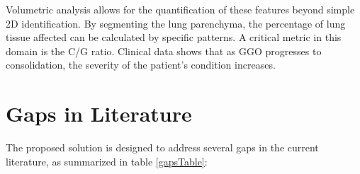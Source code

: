 Volumetric analysis allows for the quantification of these features beyond simple 2D identification. By segmenting the lung parenchyma,
the percentage of lung tissue affected can be calculated by specific patterns. A critical metric in this domain
is the C/G ratio. Clinical data shows that as GGO progresses to consolidation, the severity of the patient's condition increases\cite{webb2014fundamentals}.

\section{Gaps in Literature}
The proposed solution is designed to address several gaps in the current literature, as summarized in table \ref{gapsTable}:

\begin{table}[ht]
    \centering
    \small
    \setlength{\tabcolsep}{6pt}
    \caption{Gaps addressed by proposed approach vs existing solutions}
    \label{gapsTable}


\end{table}
